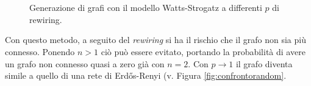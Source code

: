\begin{figure}[hb!]
	\centering
	$\;\;$
	\\
	$\;\;$
	\caption[Generazione con modello Watts-Strogatz.]{Generazione di grafi con il modello Watts-Strogatz a differenti $p$ di rewiring.}
	\label{fig:watts}
\end{figure}
\clearpage
Con questo metodo, a seguito del \emph{rewiring} si ha il rischio che il grafo non sia più connesso. Ponendo $n>1$ ciò può essere evitato, portando la probabilità di avere un grafo non connesso quasi a zero già con $n=2$.
Con $p \rightarrow 1$ il grafo diventa simile a quello di una rete di Erdős-Renyi (v. Figura \ref{fig:confrontorandom}.

